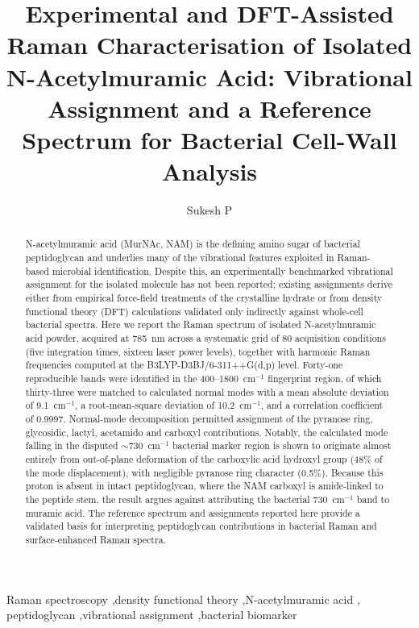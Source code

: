 \documentclass[preprint,12pt]{elsarticle}
\newcommand{\wn}{\ensuremath{\mathrm{cm}^{-1}}}
\begin{document}
\begin{frontmatter}

\title{Experimental and DFT-Assisted Raman Characterisation of Isolated
N-Acetylmuramic Acid: Vibrational Assignment and a Reference Spectrum for
Bacterial Cell-Wall Analysis}

\author[iitj]{Sukesh P}



\begin{abstract}
N-acetylmuramic acid (MurNAc, NAM) is the defining amino sugar of bacterial
peptidoglycan and underlies many of the vibrational features exploited in
Raman-based microbial identification. Despite this, an experimentally
benchmarked vibrational assignment for the isolated molecule has not been
reported; existing assignments derive either from empirical force-field
treatments of the crystalline hydrate or from density functional theory (DFT)
calculations validated only indirectly against whole-cell bacterial spectra.
Here we report the Raman spectrum of isolated N-acetylmuramic acid
powder, acquired at 785~nm across a systematic grid of 80 acquisition
conditions (five integration times, sixteen laser power levels), together with
harmonic Raman frequencies computed at the B3LYP-D3BJ/6-311++G(d,p) level. Forty-one
reproducible bands were identified in the 400--1800~\wn{} fingerprint region,
of which thirty-three were matched to calculated normal modes with a mean
absolute deviation of 9.1~\wn{}, a root-mean-square deviation of 10.2~\wn{},
and a correlation coefficient of 0.9997. Normal-mode decomposition permitted
assignment of the pyranose ring, glycosidic, lactyl, acetamido and carboxyl
contributions. Notably, the calculated mode falling in the disputed
$\sim$730~\wn{} bacterial marker region is shown to originate almost entirely
from out-of-plane deformation of the carboxylic acid hydroxyl group
(48\% of the mode displacement), with negligible pyranose ring character
(0.5\%). Because this proton is absent in intact peptidoglycan, where the
NAM carboxyl is amide-linked to the peptide stem, the result argues against
attributing the bacterial 730~\wn{} band to muramic acid. The reference
spectrum and assignments reported here provide a validated basis for
interpreting peptidoglycan contributions in bacterial Raman and
surface-enhanced Raman spectra.
\end{abstract}

\begin{keyword}
Raman spectroscopy \sep density functional theory \sep N-acetylmuramic acid \sep
peptidoglycan \sep vibrational assignment \sep bacterial biomarker
\end{keyword}

\end{frontmatter}
\end{document}
